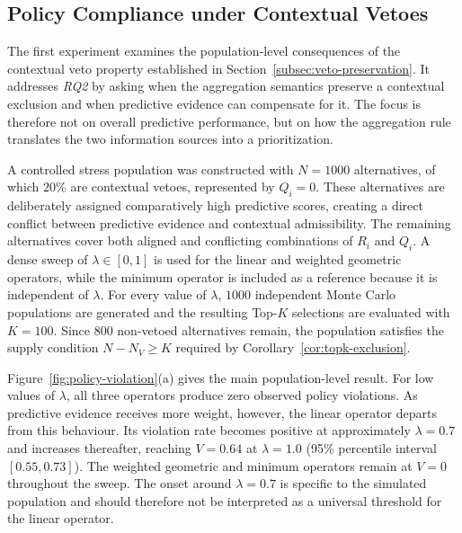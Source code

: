 \documentclass[mathematics,article,submit,moreauthors]{Definitions/mdpi}
\begin{document}
\subsection{Policy Compliance under Contextual Vetoes}
\label{subsec:simulation-policy-compliance}

The first experiment examines the population-level consequences of the
contextual veto property established in
Section~\ref{subsec:veto-preservation}. It addresses \textit{RQ2} by asking
when the aggregation semantics preserve a contextual exclusion and when
predictive evidence can compensate for it. The focus is therefore not on
overall predictive performance, but on how the aggregation rule translates
the two information sources into a prioritization.

A controlled stress population was constructed with $N=1000$ alternatives,
of which $20\%$ are contextual vetoes, represented by $Q_i=0$. These
alternatives are deliberately assigned comparatively high predictive
scores, creating a direct conflict between predictive evidence and
contextual admissibility. The remaining alternatives cover both aligned and
conflicting combinations of $R_i$ and $Q_i$. A dense sweep of
$\lambda\in[0,1]$ is used for the linear and weighted geometric operators,
while the minimum operator is included as a reference because it is
independent of $\lambda$. For every value of $\lambda$, $1000$ independent
Monte Carlo populations are generated and the resulting Top-$K$ selections
are evaluated with $K=100$. Since $800$ non-vetoed alternatives remain, the
population satisfies the supply condition
$N-N_V\geq K$ required by
Corollary~\ref{cor:topk-exclusion}.

Figure~\ref{fig:policy-violation}(a) gives the main population-level result.
For low values of $\lambda$, all three operators produce zero observed
policy violations. As predictive evidence receives more weight, however,
the linear operator departs from this behaviour. Its violation rate becomes
positive at approximately $\lambda=0.7$ and increases thereafter, reaching
$V=0.64$ at $\lambda=1.0$ (95\% percentile interval
$[0.55,0.73]$). The weighted geometric and minimum operators remain at
$V=0$ throughout the sweep. The onset around $\lambda=0.7$ is specific to
the simulated population and should therefore not be interpreted as a
universal threshold for the linear operator.
\end{document}
